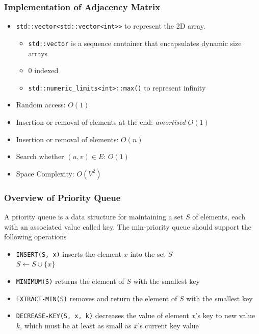 \documentclass[a4paper]{beamer}
\begin{document}
\begin{frame}
	\frametitle{Implementation of Adjacency Matrix}
	\begin{itemize}
		\item \texttt{std::vector<std::vector<int>>} to represent the 2D array. 
		\begin{itemize}
			\item \texttt{std::vector} is a sequence container that encapsulates dynamic size arrays
			\item 0 indexed
			\item \texttt{std::numeric\_limits<int>::max()} to represent infinity
		\end{itemize}
		\item Random access: \( O(1) \) 
		\item Insertion or removal of elements at the end: \emph{amortised} \( O(1) \) 
		\item Insertion or removal of elements: \( O(n) \) 
		\item Search whether \( (u,v) \in E \): \( O(1) \) 
		\item Space Complexity: \( O(V^2) \) 
	\end{itemize}
\end{frame}

\begin{frame}
	\frametitle{Overview of Priority Queue}
	A priority queue is a data structure for maintaining a set \( S \) of elements, each with an associated value called key. The min-priority queue should support the following operations
	\begin{itemize}
		\item \texttt{INSERT(S, x)} inserts the element \( x \) into the set \( S \)\\
			\( S \leftarrow S \cup \{x\} \) 
		\item \texttt{MINIMUM(S)} returns the element of $S$ with the smallest key
		\item \texttt{EXTRACT-MIN(S)} removes and return the element of \( S \) with the smallest key
		\item \texttt{DECREASE-KEY(S, x, k)} decreases the value of element \( x \)'s key to new value \( k \), which must be at least as small as \( x \)'s current key value
	\end{itemize}
\end{frame}
\end{document}
